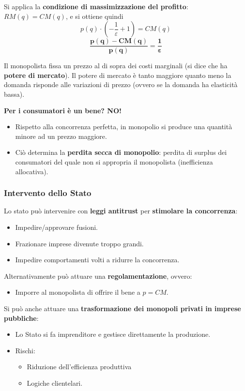 \documentclass[../main.tex]{subfiles}
\begin{document}
Si applica la \textbf{condizione di massimizzazione del profitto}: $RM(q) = CM(q)$, e si ottiene quindi
$$p(q)\cdot \left(-\frac{1}{\varepsilon}+1\right)=CM(q)$$
$$\mathbf{\frac{p(q)-CM(q)}{p(q)} = \frac{1}{\bm\varepsilon}}$$

Il monopolista fissa un prezzo al di sopra dei costi marginali (si dice che ha \textbf{potere di mercato}). Il potere di mercato è tanto maggiore quanto meno la domanda risponde alle variazioni di prezzo (ovvero se la domanda ha elasticità bassa).

\textbf{Per i consumatori è un bene? NO!}
\begin{itemize}
    \item Rispetto alla concorrenza perfetta, in monopolio si produce una quantità minore ad un prezzo maggiore.
    \item Ciò determina la \textbf{perdita secca di monopolio}: perdita di surplus dei consumatori del quale non si appropria il monopolista (inefficienza allocativa).
\end{itemize}

\subsubsection{Intervento dello Stato}

Lo stato può intervenire con \textbf{leggi antitrust} per \textbf{stimolare la concorrenza}:
\begin{itemize}
    \item Impedire/approvare fusioni.
    \item Frazionare imprese divenute troppo grandi.
    \item Impedire comportamenti volti a ridurre la concorrenza.
\end{itemize}

Alternativamente può attuare una \textbf{regolamentazione}, ovvero:
\begin{itemize}
    \item Imporre al monopolista di offrire il bene a $p = CM$.
\end{itemize}

Si può anche attuare una \textbf{trasformazione dei monopoli privati in imprese pubbliche}:
\begin{itemize}
    \item Lo Stato si fa imprenditore e gestisce direttamente la produzione.
    \item Rischi:
          \begin{itemize}
              \item Riduzione dell'efficienza produttiva
              \item Logiche clientelari.
          \end{itemize}
\end{itemize}
\end{document}
